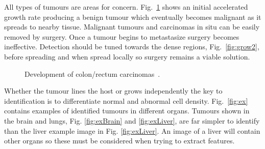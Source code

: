 \documentclass[journal]{IEEEtran}
\begin{document}
All types of tumours are areas for concern.
Fig.~\ref{fig:growing} shows an initial accelerated growth rate producing a benign tumour which eventually becomes malignant as it spreads to nearby tissue.
Malignant tumours and carcinomas in situ can be easily removed by surgery.
Once a tumour begins to metastasize surgery becomes ineffective. 
Detection should be tuned towards the dense regions, Fig.~\ref{fig:grow2}, before spreading and when spread locally so surgery remains a viable solution.    

\begin{figure}[!htb]
	\centering
\caption{Development of colon/rectum carcinomas~\cite{cooper1992cancer}.}
\label{fig:growing}
\end{figure}





Whether the tumour lines the host or grows independently the key to identification is to differentiate normal and abnormal cell density. 
Fig.~\ref{fig:ex} contains examples of identified tumours in different organs.
Tumours shown in the brain and lungs, Fig. \ref{fig:exBrain} and \ref{fig:exLiver}, are far simpler to identify than the liver example image in Fig. \ref{fig:exLiver}.
An image of a liver will contain other organs so these must be considered when trying to extract features.
\end{document}
